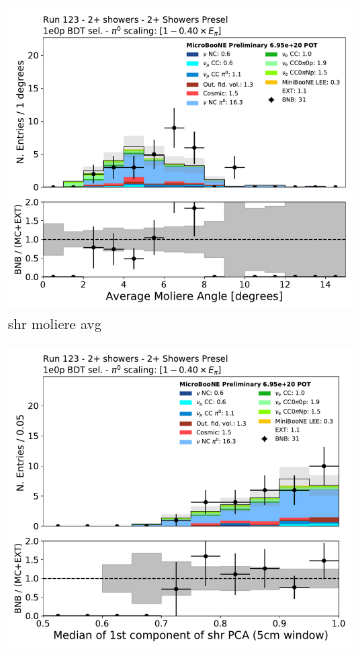 \begin{figure}[H]
    \centering
    \begin{subfigure}{0.3\textwidth}
    \includegraphics[width=1.0\textwidth]{Sidebands/Figures/TwoShr_1e0pSel/BDT/shrmoliereavg.pdf}
    \caption{shr moliere avg}
    \end{subfigure}
    \begin{subfigure}{0.3\textwidth}
    \includegraphics[width=1.0\textwidth]{Sidebands/Figures/TwoShr_1e0pSel/BDT/shrPCA1CMed_5cm.pdf}

\end{subfigure}
\end{figure}
